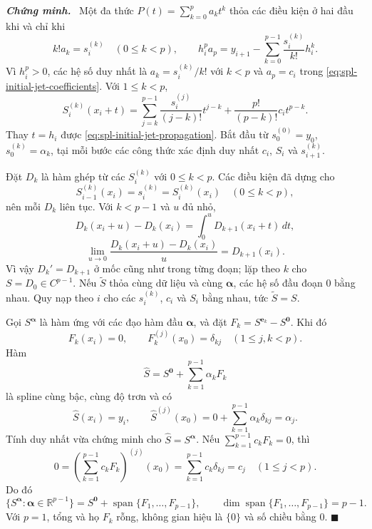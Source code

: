 \documentclass[12pt,a4paper,oneside]{book}
\numberwithin{algorithm}{chapter}
\theoremstyle{definition}
\newenvironment{chungminh}{\par\medskip\noindent\textbf{\textit{\color{mainblue}Chứng minh.}}\ }{\hfill$\blacksquare$\par\medskip}
\newcommand{\R}{\mathbb{R}}
\begin{document}
\begin{chungminh}
Một đa thức $P(t)=\sum_{k=0}^pa_kt^k$ thỏa các điều kiện ở hai đầu khi và chỉ khi
\[
 k!a_k=s_i^{(k)}\quad(0\leq k<p),\qquad
 h_i^pa_p=y_{i+1}-\sum_{k=0}^{p-1}\frac{s_i^{(k)}}{k!}h_i^k.
\]
Vì $h_i^p>0$, các hệ số duy nhất là $a_k=s_i^{(k)}/k!$ với $k<p$ và $a_p=c_i$ trong \eqref{eq:spl-initial-jet-coefficients}. Với $1\leq k<p$,
\[
 S_i^{(k)}(x_i+t)
 =\sum_{j=k}^{p-1}\frac{s_i^{(j)}}{(j-k)!}t^{j-k}
 +\frac{p!}{(p-k)!}c_it^{p-k}.
\]
Thay $t=h_i$ được \eqref{eq:spl-initial-jet-propagation}. Bắt đầu từ $s_0^{(0)}=y_0$, $s_0^{(k)}=\alpha_k$, tại mỗi bước các công thức xác định duy nhất $c_i$, $S_i$ và $s_{i+1}^{(k)}$.

Đặt $D_k$ là hàm ghép từ các $S_i^{(k)}$ với $0\leq k<p$. Các điều kiện đã dựng cho
\[
 S_{i-1}^{(k)}(x_i)=s_i^{(k)}=S_i^{(k)}(x_i)
 \quad(0\leq k<p),
\]
nên mỗi $D_k$ liên tục. Với $k<p-1$ và $u$ đủ nhỏ,
\[
 D_k(x_i+u)-D_k(x_i)=\int_0^uD_{k+1}(x_i+t)\,dt,
\]
\[
 \lim_{u\to0}\frac{D_k(x_i+u)-D_k(x_i)}u
 =D_{k+1}(x_i).
\]
Vì vậy $D_k'=D_{k+1}$ ở mốc cũng như trong từng đoạn; lặp theo $k$ cho $S=D_0\in C^{p-1}$. Nếu $\widetilde S$ thỏa cùng dữ liệu và cùng $\boldsymbol\alpha$, các hệ số đầu đoạn $0$ bằng nhau. Quy nạp theo $i$ cho các $s_i^{(k)}$, $c_i$ và $S_i$ bằng nhau, tức $\widetilde S=S$.

Gọi $S^{\boldsymbol\alpha}$ là hàm ứng với các đạo hàm đầu $\boldsymbol\alpha$, và đặt $F_k=S^{\boldsymbol e_k}-S^{\boldsymbol0}$. Khi đó
\[
 F_k(x_i)=0,\qquad F_k^{(j)}(x_0)=\delta_{kj}
 \quad(1\leq j,k<p).
\]
Hàm
\[
 \widehat S=S^{\boldsymbol0}+\sum_{k=1}^{p-1}\alpha_kF_k
\]
là spline cùng bậc, cùng độ trơn và có
\[
 \widehat S(x_i)=y_i,\qquad
 \widehat S^{(j)}(x_0)
 =0+\sum_{k=1}^{p-1}\alpha_k\delta_{kj}=\alpha_j.
\]
Tính duy nhất vừa chứng minh cho $\widehat S=S^{\boldsymbol\alpha}$. Nếu $\sum_{k=1}^{p-1}c_kF_k=0$, thì
\[
 0=\left(\sum_{k=1}^{p-1}c_kF_k\right)^{(j)}(x_0)
 =\sum_{k=1}^{p-1}c_k\delta_{kj}=c_j
 \quad(1\leq j<p).
\]
Do đó
\[
 \{S^{\boldsymbol\alpha}:\boldsymbol\alpha\in\R^{p-1}\}
 =S^{\boldsymbol0}+\operatorname{span}\{F_1,\ldots,F_{p-1}\},
 \qquad
 \dim\operatorname{span}\{F_1,\ldots,F_{p-1}\}=p-1.
\]
Với $p=1$, tổng và họ $F_k$ rỗng, không gian hiệu là $\{0\}$ và số chiều bằng $0$.
\end{chungminh}

\end{document}

